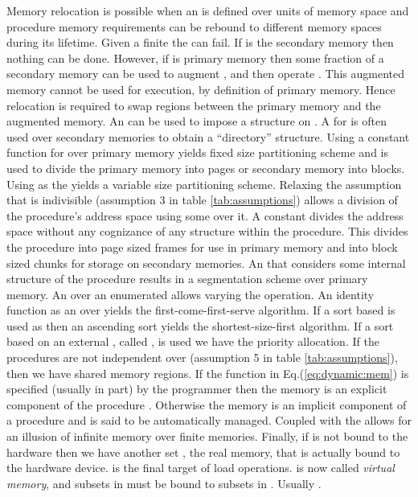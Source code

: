 \documentclass[draft]{article}
\begin{document}
Memory relocation is possible when  an  is defined over units of
memory  space and  procedure  memory requirements  can  be rebound  to
different memory spaces  during its lifetime.  Given a  finite  the
 can fail.  If  is the secondary memory then nothing can
be done.   However, if  is  primary memory then some  fraction of a
secondary  memory  can  be  used  to augment  ,  and  then  operate
.  This  augmented memory cannot be used  for execution, by
definition of  primary memory.  Hence  relocation is required  to swap
regions between the primary memory and the augmented memory.  An 
can be used to impose a structure on .  A  for  is often
used  over secondary  memories  to obtain  a ``directory''  structure.
Using a constant  function for  over primary  memory yields fixed
size partitioning scheme and is used to divide the primary memory into
pages or secondary  memory into blocks.  Using   as the 
yields a  variable size partitioning scheme.   Relaxing the assumption
that       is    indivisible   (assumption    3    in   table
\ref{tab:assumptions})  allows a division  of the  procedure's address
space using some  over  it.  A constant  divides the address
space without  any cognizance of  any structure within  the procedure.
This divides the  procedure into page sized frames  for use in primary
memory and into block sized  chunks for storage on secondary memories.
An   that  considers  some internal  structure  of the  procedure
results in a  segmentation scheme over primary memory.   An  over
an enumerated  allows  varying the  operation.  An identity
function  as  an    over   yields  the  first-come-first-serve
algorithm.   If  a sort  based   is  used  as   then  an
ascending sort  yields the  shortest-size-first algorithm.  If  a sort
based on  an external , called  , is used  we have the
priority allocation.   If the procedures are not  independent over 
(assumption  5 in  table \ref{tab:assumptions}),  then we  have shared
memory regions.  If the function  in Eq.(\ref{eq:dynamic:mem}) is
specified (usually  in part) by the  programmer then the  memory is an
explicit component of the procedure .  Otherwise the memory is an
implicit  component of  a procedure  and is  said to  be automatically
managed.  Coupled  with the   allows for an  illusion of
infinite memory over finite memories.  Finally, if  is not bound to
the hardware  then we  have another set  , the  real memory,
that is  actually bound to  the hardware device.    is the
final  target of  load operations.    is  now  called \emph{virtual
  memory}, and subsets in   must be bound to subsets in .
Usually .
\end{document}
